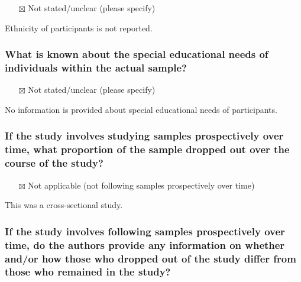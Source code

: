 \documentclass[
  doc, a4paper]{apa7}
\providecommand{\tightlist}{%
  \setlength{\itemsep}{0pt}\setlength{\parskip}{0pt}}
\begin{document}
\begin{itemize}
\tightlist
\item[$\boxtimes$]
  Not stated/unclear (please specify)
\end{itemize}

Ethnicity of participants is not reported.

\subsubsection{What is known about the special educational needs of individuals within the actual sample?}\label{what-is-known-about-the-special-educational-needs-of-individuals-within-the-actual-sample}

\begin{itemize}
\tightlist
\item[$\boxtimes$]
  Not stated/unclear (please specify)
\end{itemize}

No information is provided about special educational needs of participants.

\subsubsection{If the study involves studying samples prospectively over time, what proportion of the sample dropped out over the course of the study?}\label{if-the-study-involves-studying-samples-prospectively-over-time-what-proportion-of-the-sample-dropped-out-over-the-course-of-the-study}

\begin{itemize}
\tightlist
\item[$\boxtimes$]
  Not applicable (not following samples prospectively over time)
\end{itemize}

This was a cross-sectional study.

\subsubsection{If the study involves following samples prospectively over time, do the authors provide any information on whether and/or how those who dropped out of the study differ from those who remained in the study?}\label{if-the-study-involves-following-samples-prospectively-over-time-do-the-authors-provide-any-information-on-whether-andor-how-those-who-dropped-out-of-the-study-differ-from-those-who-remained-in-the-study}
\end{document}
